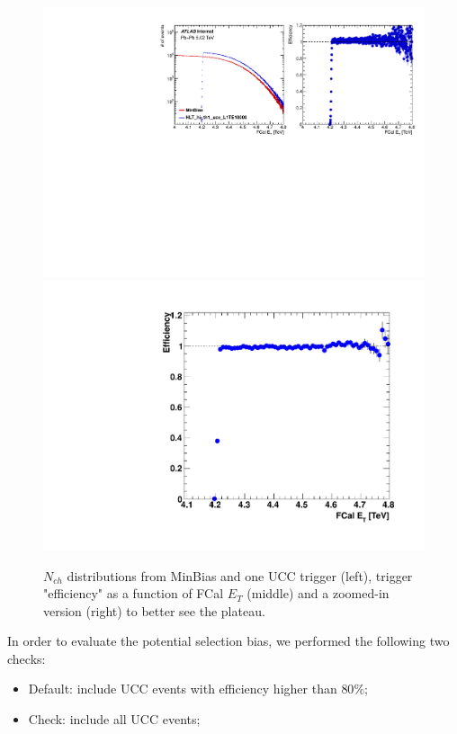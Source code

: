 \begin{figure}[H]
\centering
\includegraphics[width=.6\linewidth]{figs/sec_sys/trigEff_2.pdf}
\includegraphics[width=.3\linewidth]{figs/sec_sys/trigEff_zoom.pdf}
\caption{$N_{ch}$ distributions from MinBias and one UCC trigger (left), trigger "efficiency" as a function of FCal $E_{T}$ (middle) and a zoomed-in version (right) to better see the plateau.}
\label{fig:sys_trigEff_eg}
\end{figure}

In order to evaluate the potential selection bias, we performed the following two checks:
\begin{itemize}
\item Default: include UCC events with efficiency higher than $80\%$;
\item Check: include all UCC events;
\end{itemize}

